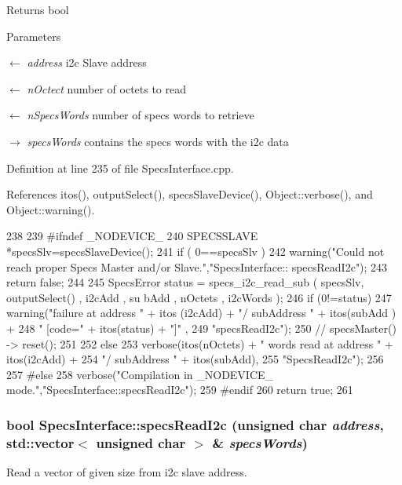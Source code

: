 \begin{DoxyReturn}{Returns}
bool 
\end{DoxyReturn}

\begin{DoxyParams}{Parameters}
\item[\mbox{$\leftarrow$} {\em address}]i2c Slave address \item[\mbox{$\leftarrow$} {\em nOctect}]number of octets to read \item[\mbox{$\leftarrow$} {\em nSpecsWords}]number of specs words to retrieve \item[\mbox{$\rightarrow$} {\em specsWords}]contains the specs words with the i2c data \end{DoxyParams}


Definition at line 235 of file SpecsInterface.cpp.

References itos(), outputSelect(), specsSlaveDevice(), Object::verbose(), and Object::warning().


\begin{DoxyCode}
238                                              {
239 #ifndef _NODEVICE_
240   SPECSSLAVE *specsSlv=specsSlaveDevice();
241   if ( 0==specsSlv ){
242     warning("Could not reach proper Specs Master and/or Slave.","SpecsInterface::
      specsReadI2c");
243     return false;
244   }
245   SpecsError status = specs_i2c_read_sub ( specsSlv, outputSelect() , i2cAdd , su
      bAdd , nOctets , i2cWords );
246   if (0!=status){
247     warning("failure at address " + itos (i2cAdd) + "/ subAddress " + itos(subAdd
      ) +
248             " [code=" + itos(status) + "]" ,
249             "specsReadI2c");
250     //    specsMaster() -> reset();
251   }
252   else {
253     verbose(itos(nOctets) + " words read at address " + itos(i2cAdd) +
254             "/ subAddress " + itos(subAdd),
255             "SpecsReadI2c");
256   }
257 #else
258   verbose("Compilation in _NODEVICE_ mode.","SpecsInterface::specsReadI2c");
259 #endif
260   return true;
261 }
\end{DoxyCode}
\hypertarget{classSpecsInterface_ab61d866ec9b8a48e84a867004c1ed662}{
\subsubsection[{specsReadI2c}]{\setlength{\rightskip}{0pt plus 5cm}bool SpecsInterface::specsReadI2c (unsigned char {\em address}, \/  std::vector$<$ unsigned char $>$ \& {\em specsWords})}}
\label{classSpecsInterface_ab61d866ec9b8a48e84a867004c1ed662}
Read a vector of given size from i2c slave address.

